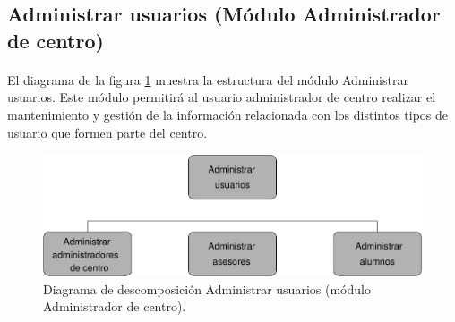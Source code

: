 \subsection{Administrar usuarios (Módulo Administrador de centro)}

  \paragraph{}El diagrama de la figura
  \ref{diagramaDescomposicionAdministrarUsuarios-admCentro} muestra la
  estructura del módulo Administrar usuarios. Este módulo permitirá al usuario
  administrador de centro realizar el mantenimiento y gestión de la información
  relacionada con los distintos tipos de usuario que formen parte del centro.

  \begin{figure}[!ht]
    \begin{center}
      \includegraphics[]{11.Disenyo_Arquitectonico/11.2.Diagramas_Descomposicion/11.2.3.Modulo_administrador_centro/AdministrarBBDD/AdministrarUsuarios/Diagramas/administrar_usuarios.pdf}
      \caption{Diagrama de descomposición Administrar usuarios (módulo Administrador de centro).}
      \label{diagramaDescomposicionAdministrarUsuarios-admCentro}
    \end{center}
  \end{figure}

 
 
 